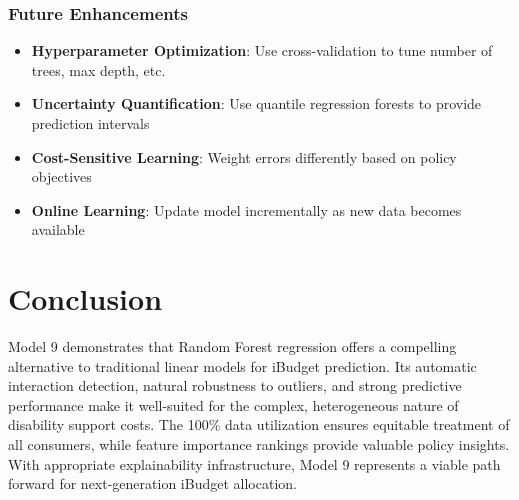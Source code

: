 \subsubsection{Future Enhancements}

\begin{itemize}
    \item \textbf{Hyperparameter Optimization}: Use cross-validation to tune number of trees, max depth, etc.
    \item \textbf{Uncertainty Quantification}: Use quantile regression forests to provide prediction intervals
    \item \textbf{Cost-Sensitive Learning}: Weight errors differently based on policy objectives
    \item \textbf{Online Learning}: Update model incrementally as new data becomes available
\end{itemize}

\section{Conclusion}

Model 9 demonstrates that Random Forest regression offers a compelling alternative to traditional linear models for iBudget prediction. Its automatic interaction detection, natural robustness to outliers, and strong predictive performance make it well-suited for the complex, heterogeneous nature of disability support costs. The 100\% data utilization ensures equitable treatment of all consumers, while feature importance rankings provide valuable policy insights. With appropriate explainability infrastructure, Model 9 represents a viable path forward for next-generation iBudget allocation.